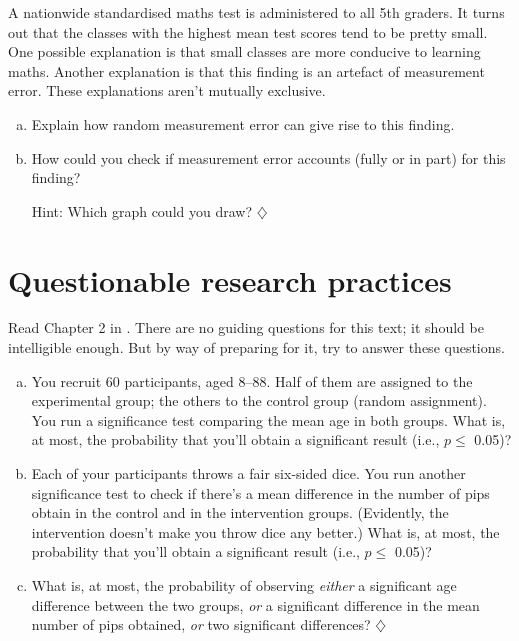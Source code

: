 \documentclass[a4paper]{tufte-book}\usepackage[]{graphicx}\usepackage[]{xcolor}
\newcommand*{\parend}[1][$\diamondsuit$]{%
  \unskip\nobreak\hspace{1em plus 1fill}$\diamondsuit$%
}
\begin{document}
A nationwide standardised maths test is administered
to all 5th graders. It turns out that the classes with
the highest mean test scores tend to be pretty small.
One possible explanation is that small classes are more
conducive to learning maths.
Another explanation is that this finding is an artefact
of measurement error. 
These explanations aren't mutually exclusive.

\begin{enumerate}[(a)]
  \item Explain how random measurement error can give rise to this finding.
  \item How could you check if measurement error accounts (fully or in part)
        for this finding?
        
        Hint: Which graph could you draw?\parend
\end{enumerate}


\chapter{Questionable research practices}\label{ch:qrp}

Read Chapter 2 in \citet{Chambers2017}.
There are no guiding questions for this text; it should be
intelligible enough. But by way of preparing for it, try
to answer these questions.

\begin{enumerate}[(a)]
  \item You recruit 60 participants, aged 8--88. Half of them
  are assigned to the experimental group; the others to the
  control group (random assignment). You run a significance test
  comparing the mean age in both groups. What is, at most, the probability
  that you'll obtain a significant result (i.e., $p \leq$ 0.05)?
  
  \item Each of your participants throws a fair six-sided dice.
  You run another significance test to check if there's a mean
  difference in the number of pips obtain in the control and in
  the intervention groups. (Evidently, the intervention doesn't
  make you throw dice any better.)
  What is, at most, the probability
  that you'll obtain a significant result (i.e., $p \leq$ 0.05)?
  
  \item What is, at most, the probability of observing
  \emph{either} a significant age difference between the two groups,
  \emph{or} a significant difference in the mean number of pips obtained,
  \emph{or} two significant differences? \parend
\end{enumerate}
\end{document}
